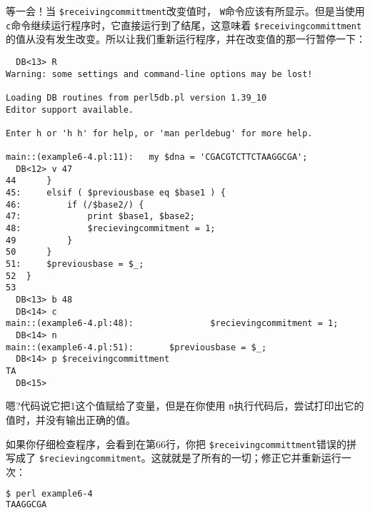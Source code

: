 等一会！当 \verb|$receivingcommittment|改变值时， \verb|W|命令应该有所显示。但是当使用 \verb|c|命令继续运行程序时，它直接运行到了结尾，这意味着 \verb|$receivingcommittment|的值从没有发生改变。所以让我们重新运行程序，并在改变值的那一行暂停一下：

%
%
%
%
\begin{lstlisting}
  DB<13> R
Warning: some settings and command-line options may be lost!

Loading DB routines from perl5db.pl version 1.39_10
Editor support available.

Enter h or 'h h' for help, or 'man perldebug' for more help.

main::(example6-4.pl:11):	my $dna = 'CGACGTCTTCTAAGGCGA';
  DB<12> v 47
44 	    }
45:	    elsif ( $previousbase eq $base1 ) {
46:	        if (/$base2/) {
47:	            print $base1, $base2;
48:	            $recievingcommitment = 1;
49 	        }
50 	    }
51:	    $previousbase = $_;
52 	}
53 	
  DB<13> b 48
  DB<14> c
main::(example6-4.pl:48):	            $recievingcommitment = 1;
  DB<14> n
main::(example6-4.pl:51):	    $previousbase = $_;
  DB<14> p $receivingcommittment
TA
  DB<15> 
\end{lstlisting}

嗯?代码说它把1这个值赋给了变量，但是在你使用 \verb|n|执行代码后，尝试打印出它的值时，并没有输出正确的值。

如果你仔细检查程序，会看到在第66行，你把 \verb|$receivingcommittment|错误的拼写成了 \verb|$recievingcommitment|。这就就是了所有的一切；修正它并重新运行一次：

\begin{lstlisting}[language=bash]
$ perl example6-4
TAAGGCGA 
\end{lstlisting}

